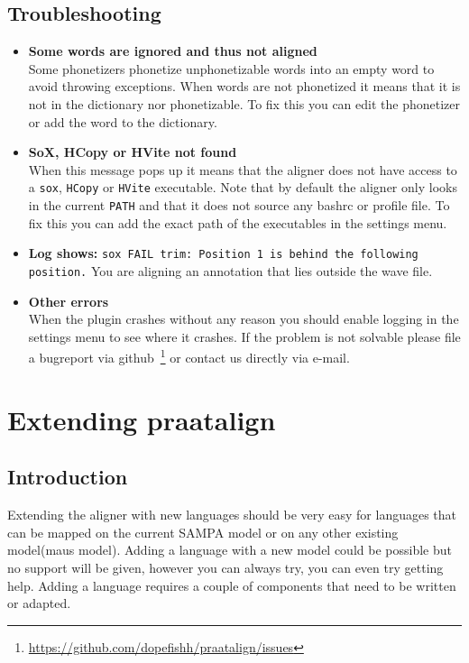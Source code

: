 \section{Troubleshooting}
\begin{itemize}
	\item \textbf{Some words are ignored and thus not aligned}\\
		Some phonetizers phonetize unphonetizable words into an empty word to avoid
		throwing exceptions. When words are not phonetized it means that it is not
		in the dictionary nor phonetizable. To fix this you can edit the phonetizer
		or add the word to the dictionary.
	\item \textbf{SoX, HCopy or HVite not found}\\
		When this message pops up it means that the aligner does not have access to
		a \texttt{sox}, \texttt{HCopy} or \texttt{HVite} executable. Note that by
		default the aligner only looks in the current \texttt{PATH} and that it
		does not source any bashrc or profile file. To fix this you can add the
		exact path of the executables in the settings menu.
	\item \textbf{Log shows: }\texttt{sox FAIL trim: Position 1 is behind the
following position.}
		You are aligning an annotation that lies outside the wave file.
	\item \textbf{Other errors}\\
		When the plugin crashes without any reason you should enable logging in the
		settings menu to see where it crashes. If the problem is not solvable
		please file a bugreport via
		github~\footnote{\url{https://github.com/dopefishh/praatalign/issues}} or
		contact us directly via e-mail.
\end{itemize}


\chapter{Extending praatalign}
\section{Introduction}
Extending the aligner with new languages should be very easy for languages that
can be mapped on the current SAMPA model or on any other existing model(maus
model).
Adding a language with a new model could be possible but no support will be
given, however you can always try, you can even try getting help. Adding a
language requires a couple of components that need to be written or adapted.


